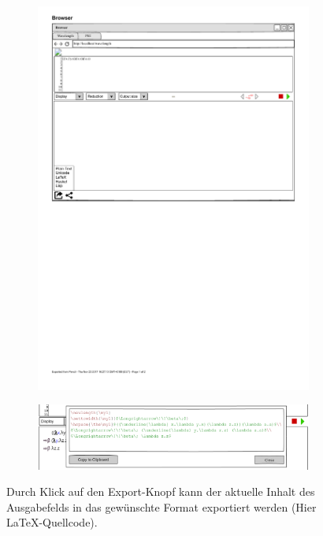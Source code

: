 \documentclass[parskip=full,11pt,twoside]{scrartcl}
\begin{document}
\begin{figure}[H]
	\begin{subfigure}{0.25\textwidth}
		\centering
		\includegraphics{img/exportMenu}
	\end{subfigure}
	\begin{subfigure}{0.75\textwidth}
		\centering
		\includegraphics[width=1.1\textwidth]{img/export_latex_ausschnitt.png}
	\end{subfigure}
	\caption{\label{fig:export}Durch Klick auf den Export-Knopf kann der aktuelle Inhalt des Ausgabefelds in das gewünschte Format exportiert werden (Hier \LaTeX -Quellcode).}
\end{figure}
\end{document}
